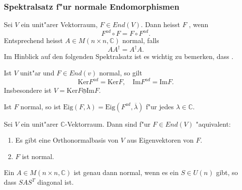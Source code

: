 \documentclass[9pt, a4paper, twocolumn, landscape]{article}
\begin{document}
\subsubsection{Spektralsatz f"ur normale Endomorphismen}

\begin{definition}
Sei $V$ ein unit"arer Vektorraum, $F \in End(V)$. Dann heisst $F$ , wenn 
$$
F^{ad}\circ F = F \circ F^{ad}.
$$
Entsprechend heisst $A \in M(n \times n, \mathbb{C})$ normal, falls
$$
A A^\dagger = A^\dagger A.
$$
Im Hinblick auf den folgenden Spektralsatz ist es wichtig zu bemerken, dass .
\end{definition}

\begin{theorem}
Ist $V$ unit"ar und $F \in End(v)$ normal, so gilt
$$
\mathrm{Ker}F^{ad} = \mathrm{Ker}F, \quad \mathrm{Im}F^{ad} = \mathrm{Im}F.
$$
Insbesondere ist $V = \mathrm{Ker}F \obot \mathrm{Im}F$.
\end{theorem}

\begin{corollary}
Ist $F$ normal, so ist $\mathrm{Eig}(F, \lambda) = \mathrm{Eig}(F^{ad}, \overline{\lambda})$ f"ur jedes $\lambda \in \mathbb{C}$.
\end{corollary}

\begin{theorem} 
Sei $V$ ein unit"arer $\mathbb{C}$-Vektorraum. Dann sind f"ur $F \in End(V)$ "aquivalent:
\begin{enumerate}
\item Es gibt eine Orthonormalbasis von $V$ aus Eigenvektoren von $F$.
\item $F$ ist normal.
\end{enumerate}
\end{theorem}

\begin{corollary}
Ein $A \in M (n \times n, \mathbb{C})$ ist genau dann normal, wenn es ein $S \in U(n)$ gibt, so dass $SAS^T$ diagonal ist.
\end{corollary}
\end{document}
